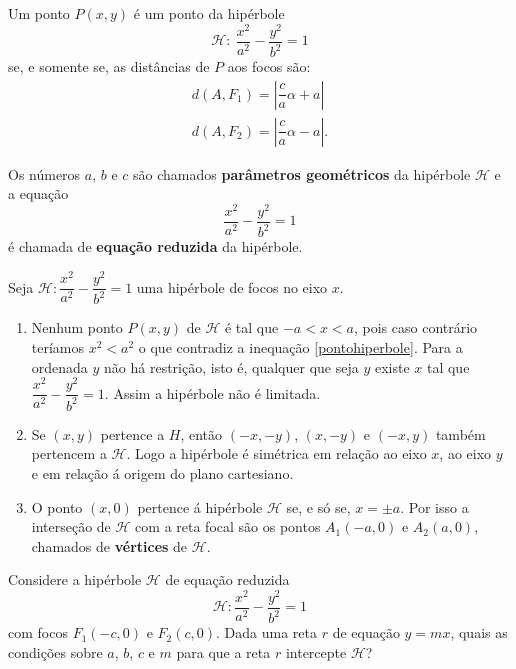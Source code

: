 \begin{proposicao}
  Um ponto $P(x, y)$ é um ponto da hipérbole
  \[
    \mathcal{H}:\ \dfrac{x^2}{a^2} - \dfrac{y^2}{b^2} = 1
  \]
  se, e somente se, as distâncias de $P$ aos focos são:
  \begin{align*}
    d(A,F_1) = \left|\dfrac{c}{a}\alpha + a\right|\\
    d(A,F_2) = \left|\dfrac{c}{a}\alpha - a\right|.
  \end{align*}
\end{proposicao}

Os n\'umeros $a$, $b$ e $c$ são chamados \textbf{parâmetros geométricos} da hipérbole $\mathcal{H}$ e a equação
\[
  \dfrac{x^2}{a^2} - \dfrac{y^2}{b^2} = 1
\]
é chamada de \textbf{equação reduzida} da hipérbole. 

\begin{observacao}
  Seja $\mathcal{H} : \dfrac{x^2}{a^2} - \dfrac{y^2}{b^2} = 1$ uma hipérbole de focos no eixo $x$.
  \begin{enumerate}
    \item Nenhum ponto $P(x,y)$ de $\mathcal{H}$ é tal que $-a < x < a$, pois caso contr\'ario teríamos $x^2 < a^2$ o que contradiz a inequação \eqref{pontohiperbole}. Para a ordenada $y$ não h\'a restrição, isto é, qualquer que seja $y$ existe $x$ tal que $\dfrac{x^2}{a^2} - \dfrac{y^2}{b^2} = 1$. Assim a hipérbole não é limitada.
    \item Se $(x,y)$ pertence a $H$, então $(-x,-y)$, $(x,-y)$ e $(-x,y)$ também pertencem a $\mathcal{H}$. Logo a hipérbole é simétrica em relação ao eixo $x$, ao eixo $y$  e em relação á origem do plano cartesiano.
    \item O ponto $(x,0)$ pertence á hipérbole $\mathcal{H}$ se, e s\'o se, $x = \pm a$. Por isso a interseção de $\mathcal{H}$ com a reta focal são os pontos $A_1(-a,0)$ e $A_2(a,0)$, chamados de \textbf{vértices} de $\mathcal{H}$.
  \end{enumerate}
\end{observacao}

Considere a hipérbole $\mathcal{H}$ de equação reduzida
\[
  \mathcal{H} : \dfrac{x^2}{a^2} - \dfrac{y^2}{b^2} = 1
\]
com focos $F_1(-c,0)$ e $F_2(c,0)$. Dada uma reta $r$ de equação $y = mx$, quais as condições sobre $a$, $b$, $c$ e $m$ para que a reta $r$ intercepte $\mathcal{H}$?

